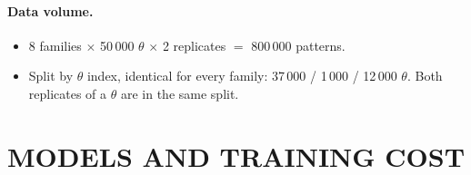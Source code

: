 \paragraph{Data volume.}
\begin{itemize}
  \item 8 families $\times$ 50\,000 $\theta$ $\times$ 2 replicates $=$ 800\,000 patterns.
  \item Split by $\theta$ index, identical for every family: 37\,000 / 1\,000 / 12\,000 $\theta$. Both replicates of
        a $\theta$ are in the same split.
\end{itemize}


\section{MODELS AND TRAINING COST}
\label{app:models}

